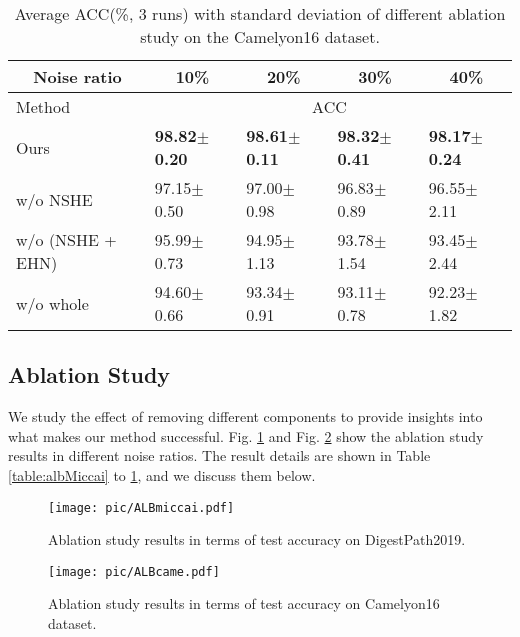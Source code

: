 \begin{table}[]
\scriptsize
\centering
\caption{Average ACC(\%, 3 runs) with standard deviation of different ablation study on the Camelyon16 dataset.}
\label{table:albCame}
\begin{tabular}{lllll}
\toprule
\multicolumn{1}{c}{Noise ratio}            & \multicolumn{1}{c}{10\%} & \multicolumn{1}{c}{20\%} & \multicolumn{1}{c}{30\%} & \multicolumn{1}{c}{40\%} \\ \midrule
Method                 & \multicolumn{4}{c}{ACC}                                                                                     \\ \midrule
Ours                                       & \textbf{98.82$\pm$0.20}      & \textbf{98.61$\pm$0.11}      & \textbf{98.32$\pm$0.41}      & \textbf{98.17$\pm$0.24}     \\ 
w/o NSHE                        & 97.15$\pm$0.50               & 97.00$\pm$0.98               & 96.83$\pm$0.89               & 96.55$\pm$2.11              \\ 
w/o (NSHE + EHN)       & 95.99$\pm$0.73               & 94.95$\pm$1.13               & 93.78$\pm$1.54               & 93.45$\pm$2.44              \\ 
w/o whole & 94.60$\pm$0.66               & 93.34$\pm$0.91               & 93.11$\pm$0.78               & 92.23$\pm$1.82              \\ \bottomrule
\end{tabular}
\end{table}


\subsection{Ablation Study}

We study the effect of removing different components to provide insights into what makes our method successful. Fig. \ref{fig:albMiccai} and Fig. \ref{fig:albCame} show the ablation study results in different noise ratios. The result details are shown in Table \ref{table:albMiccai} to \ref{table:albCame}, and we discuss them below.



\begin{figure}[]
  \centering
  \texttt{[image: pic/ALBmiccai.pdf]}
\caption{{Ablation study results in terms of test accuracy on DigestPath2019.}}
  \label{fig:albMiccai}
\end{figure}
\begin{figure}[]
  \centering
  \texttt{[image: pic/ALBcame.pdf]}
\caption{{Ablation study results in terms of test accuracy on Camelyon16 dataset.}}
  \label{fig:albCame}
\end{figure}


